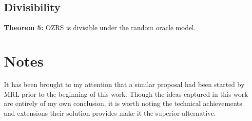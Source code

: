 \documentclass{article}
\begin{document}
\subsection{Divisibility}

{\bf Theorem 5:} OZRS is divisible under the random oracle model.

\section{Notes}

It has been brought to my attention that a similar proposal had been started by
MRL \cite{N15} prior to the beginning of this work.  Though the ideas captured
in this work are entirely of my own conclusion, it is worth noting the technical
achievements and extensions their solution provides make it the superior
alternative.


\end{document}

